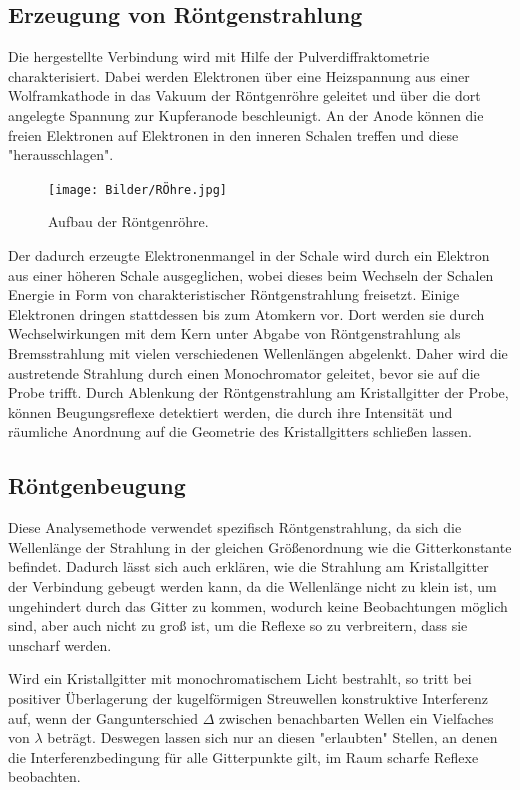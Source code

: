 \documentclass[a4paper,12pt,bibliography=totocnumbered]{scrartcl}
\begin{document}
\subsection{Erzeugung von Röntgenstrahlung}
Die hergestellte Verbindung wird mit Hilfe der Pulverdiffraktometrie charakterisiert.
Dabei werden Elektronen über eine Heizspannung aus einer Wolframkathode in das Vakuum der Röntgenröhre geleitet und über die dort angelegte Spannung zur Kupferanode beschleunigt. 
An der Anode können die freien Elektronen auf Elektronen in den inneren Schalen treffen und diese "herausschlagen".
\begin{figure}[H]
    \centering
    \texttt{[image: Bilder/RÖhre.jpg]}
    \caption{Aufbau der Röntgenröhre. \cite{Kristallgitter}}
    \label{fig: Röhre}
\end{figure}
Der dadurch erzeugte Elektronenmangel in der Schale wird durch ein Elektron aus einer höheren Schale ausgeglichen, wobei dieses beim Wechseln der Schalen Energie in Form von charakteristischer Röntgenstrahlung freisetzt. 
Einige Elektronen dringen stattdessen bis zum Atomkern vor. 
Dort werden sie durch Wechselwirkungen mit dem Kern unter Abgabe von Röntgenstrahlung als Bremsstrahlung mit vielen verschiedenen Wellenlängen abgelenkt.
Daher wird die austretende Strahlung durch einen Monochromator geleitet, bevor sie auf die Probe trifft. 
Durch Ablenkung der Röntgenstrahlung am Kristallgitter der Probe, können Beugungsreflexe detektiert werden, die durch ihre Intensität und räumliche Anordnung auf die Geometrie des Kristallgitters schließen lassen.

\subsection{Röntgenbeugung}
Diese Analysemethode verwendet spezifisch Röntgenstrahlung, da sich die Wellenlänge der Strahlung in der gleichen Größenordnung wie die Gitterkonstante befindet. \cite{Kristallgitter}
Dadurch lässt sich auch erklären, wie die Strahlung am Kristallgitter der Verbindung gebeugt werden kann, da die Wellenlänge nicht zu klein ist, um ungehindert durch das Gitter zu kommen, wodurch keine Beobachtungen möglich sind, aber auch nicht zu groß ist, um die Reflexe so zu verbreitern, dass sie unscharf werden.

Wird ein Kristallgitter mit monochromatischem Licht bestrahlt, so tritt bei positiver Überlagerung der kugelförmigen Streuwellen konstruktive Interferenz auf, wenn der Gangunterschied $\Delta$ zwischen benachbarten Wellen ein Vielfaches von $\lambda$ beträgt. \cite{Kristallgitter}
Deswegen lassen sich nur an diesen "erlaubten" Stellen, an denen die Interferenzbedingung für alle Gitterpunkte gilt, im Raum scharfe Reflexe beobachten.
\end{document}
